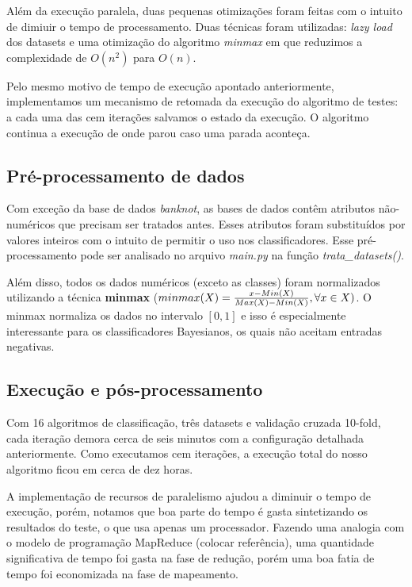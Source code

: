 \documentclass[11pt]{article}
\begin{document}
Além da execução paralela, duas pequenas otimizações foram feitas com o intuito
de dimiuir o tempo de processamento. Duas técnicas foram utilizadas:
\textit{lazy load} dos datasets e uma otimização do algoritmo \textit{minmax}
em que reduzimos a complexidade de $O(n^2)$ para $O(n)$.


Pelo mesmo motivo de tempo de execução apontado anteriormente, implementamos um
mecanismo de retomada da execução do algoritmo de testes: a cada uma das cem
iterações salvamos o estado da execução. O algoritmo continua a execução de
onde parou caso uma parada aconteça.

\subsection{Pré-processamento de dados}

Com exceção da base de dados \textit{banknot}, as bases de dados contêm
atributos não-numéricos que precisam ser tratados antes. Esses atributos foram
substituídos por valores inteiros com o intuito de permitir o uso nos
classificadores. Esse pré-processamento pode ser analisado no arquivo
\textit{main.py} na função \textit{trata\_datasets()}.

Além disso, todos os dados numéricos (exceto as classes) foram normalizados
utilizando a técnica \textbf{minmax} ($minmax(X) = {x-Min(X)\over{Max(X)-Min(X)}}, \forall x \in X)$. 
O minmax normaliza os dados no intervalo $[0,1]$ e isso é especialmente
interessante para os classificadores Bayesianos, os quais não aceitam entradas
negativas.

\subsection{Execução e pós-processamento}

Com 16 algoritmos de classificação, três datasets e validação cruzada 10-fold,
cada iteração demora cerca de seis minutos com a configuração detalhada
anteriormente. Como executamos cem iterações, a execução total do nosso
algoritmo ficou em cerca de dez horas.

A implementação de recursos de paralelismo ajudou a diminuir o tempo de
execução, porém, notamos que boa parte do tempo é gasta sintetizando os
resultados do teste, o que usa apenas um processador. Fazendo uma analogia com
o modelo de programação MapReduce (colocar referência), uma quantidade
significativa de tempo foi gasta na fase de redução, porém uma boa fatia de
tempo foi economizada na fase de mapeamento.
\end{document}
